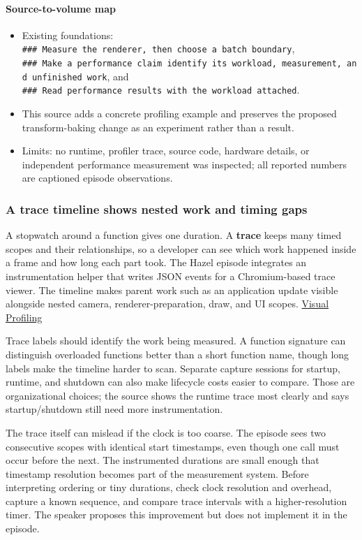 \paragraph{Source-to-volume map}\label{source-to-volume-map}

\begin{itemize}
\tightlist
\item
  Existing foundations: \texttt{\#\#\#\ Measure\ the\ renderer,\ then\ choose\ a\ batch\ boundary}, \texttt{\#\#\#\ Make\ a\ performance\ claim\ identify\ its\ workload,\ measurement,\ and\ unfinished\ work}, and \texttt{\#\#\#\ Read\ performance\ results\ with\ the\ workload\ attached}.
\item
  This source adds a concrete profiling example and preserves the proposed transform-baking change as an experiment rather than a result.
\item
  Limits: no runtime, profiler trace, source code, hardware details, or independent performance measurement was inspected; all reported numbers are captioned episode observations.
\end{itemize}

\subsubsection{A trace timeline shows nested work and timing gaps}\label{a-trace-timeline-shows-nested-work-and-timing-gaps}

A stopwatch around a function gives one duration. A \textbf{trace} keeps many timed scopes and their relationships, so a developer can see which work happened inside a frame and how long each part took. The Hazel episode integrates an instrumentation helper that writes JSON events for a Chromium-based trace viewer. The timeline makes parent work such as an application update visible alongside nested camera, renderer-preparation, draw, and UI scopes. \href{https://www.youtube.com/watch?v=qiD39bB7DvA}{Visual Profiling}

Trace labels should identify the work being measured. A function signature can distinguish overloaded functions better than a short function name, though long labels make the timeline harder to scan. Separate capture sessions for startup, runtime, and shutdown can also make lifecycle costs easier to compare. Those are organizational choices; the source shows the runtime trace most clearly and says startup/shutdown still need more instrumentation.

The trace itself can mislead if the clock is too coarse. The episode sees two consecutive scopes with identical start timestamps, even though one call must occur before the next. The instrumented durations are small enough that timestamp resolution becomes part of the measurement system. Before interpreting ordering or tiny durations, check clock resolution and overhead, capture a known sequence, and compare trace intervals with a higher-resolution timer. The speaker proposes this improvement but does not implement it in the episode.

